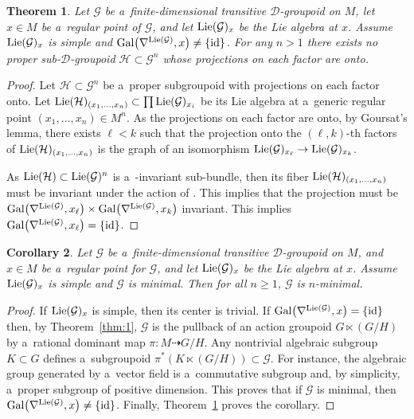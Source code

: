 \documentclass[pdftex]{sigma}
\numberwithin{equation}{section}
\newtheorem{Theorem}{Theorem}[section]
\newtheorem{Corollary}[Theorem]{Corollary}
\theoremstyle{definition}
\begin{document}
\begin{Theorem}\label{thm:7}
 Let $\mathcal G$ be a~finite-dimensional transitive $\mathcal D$-groupoid on $M$, let $x\in M$ be a~regular point of $\mathcal G$, and let ${\rm Lie}(\mathcal G)_x$ be the Lie algebra at $x$. Assume ${\rm Lie}(\mathcal G)_x$ is simple and ${\rm Gal}\bigl(\nabla^{{\rm Lie}(\mathcal G)}, x\bigr) \not = \{ {\rm id} \}$.
 For any $n >1$ there exists no proper sub-$\mathcal D$-groupoid $\mathcal H \subset \mathcal G^n$ whose projections on each factor are onto.
\end{Theorem}

\begin{proof}
Let $\mathcal H \subset \mathcal G^n$ be a~proper subgroupoid with projections on each factor onto. Let ${\rm Lie}(\mathcal H)_{(x_1,\dots,x_n)} \subset \prod \mathfrak {\rm Lie}(\mathcal G)_{x_i}$ be its Lie algebra at a~generic regular point $(x_1,\dots, x_n) \in M^n$. As the projections on each factor are onto, by Goursat's lemma, there exists $\ell<k$ such that the projection onto the $(\ell,k)$-th factors of ${\rm Lie}(\mathcal H)_{(x_1,\dots,x_n)}$ is the graph of an isomorphism ${\rm Lie}(\mathcal G)_{x_\ell} \to {\rm Lie}(\mathcal G)_{x_k}$.

As ${\rm Lie}(\mathcal H) \subset {\rm Lie}(\mathcal G)^n$ is a~-invariant sub-bundle, then its fiber ${\rm Lie}(\mathcal H)_{(x_1,\dots,x_n)}$ must be invariant under the action of . This implies that the projection must be ${\rm Gal}\bigl(\nabla^{{\rm Lie}(\mathcal G)},x_\ell\bigr) \times {\rm Gal}\bigl(\nabla^{{\rm Lie}(\mathcal G)}, x_k\bigr)$ invariant. This implies ${\rm Gal}\bigl(\nabla^{{\rm Lie}(\mathcal G)}, x_\ell\bigr) = \{{\rm id}\}$.
\end{proof}

\begin{Corollary}
 Let $\mathcal G$ be a~finite-dimensional transitive $\mathcal D$-groupoid on $M$, and $x\in M$ be a~regular point for $\mathcal G$, and let ${\rm Lie}(\mathcal G)_x$ be the Lie algebra at $x$. Assume ${\rm Lie}(\mathcal G)_x$ is simple and $\mathcal G$ is minimal.
 Then for all $n \geq 1$, $\mathcal G$ is $n$-minimal.
\end{Corollary}

\begin{proof}
If ${\rm Lie}(\mathcal G)_x$ is simple, then its center is trivial. If ${\rm Gal}\bigl(\nabla^{{\rm Lie}(\mathcal G)},x\bigr) = \{\rm id\}$ then, by Theorem~\ref{thm:1}, $\mathcal G$ is the pullback of an action groupoid $G\ltimes (G/H)$ by a~rational dominant map $\pi\colon M \dasharrow G/H$. Any nontrivial algebraic subgroup $K \subset G$ defines a~subgroupoid $\pi^*(K\ltimes (G/H))\subset \mathcal G$. For instance, the algebraic group generated by a~vector field is a~commutative subgroup and, by simplicity, a~proper subgroup of positive dimension. This proves that if $\mathcal G$ is minimal, then ${\rm Gal} \bigl(\nabla^{{\rm Lie}(\mathcal G)},x\bigr)\not = \{ {\rm id}\}$. Finally, Theorem~\ref{thm:7} proves the corollary.
\end{proof}
\end{document}
